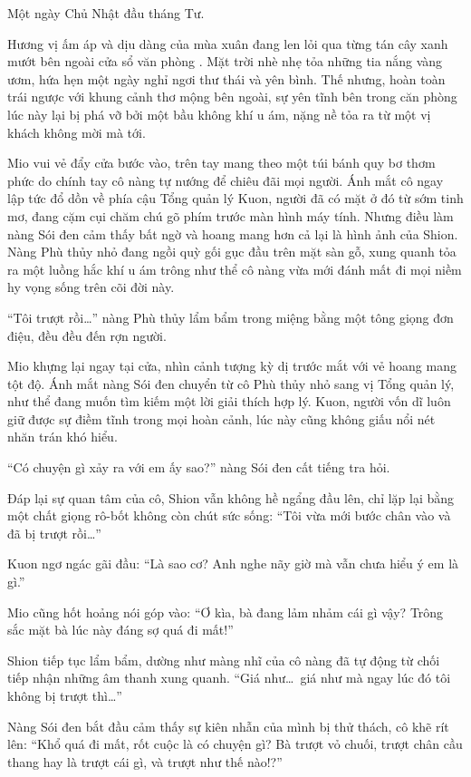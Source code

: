 \documentclass[../main.tex]{subfiles}
\begin{document}
Một ngày Chủ Nhật đầu tháng Tư.

Hương vị ấm áp và dịu dàng của mùa xuân đang len lỏi qua từng tán cây xanh mướt bên ngoài cửa sổ văn phòng \hll. Mặt trời nhè nhẹ tỏa những tia nắng vàng ươm, hứa hẹn một ngày nghỉ ngơi thư thái và yên bình. Thế nhưng, hoàn toàn trái ngược với khung cảnh thơ mộng bên ngoài, sự yên tĩnh bên trong căn phòng lúc này lại bị phá vỡ bởi một bầu không khí u ám, nặng nề tỏa ra từ một vị khách không mời mà tới.

Mio vui vẻ đẩy cửa bước vào, trên tay mang theo một túi bánh quy bơ thơm phức do chính tay cô nàng tự nướng để chiêu đãi mọi người. Ánh mắt cô ngay lập tức đổ dồn về phía cậu Tổng quản lý Kuon, người đã có mặt ở đó từ sớm tinh mơ, đang cặm cụi chăm chú gõ phím trước màn hình máy tính. Nhưng điều làm nàng Sói đen cảm thấy bất ngờ và hoang mang hơn cả lại là hình ảnh của Shion. Nàng Phù thủy nhỏ đang ngồi quỳ gối gục đầu trên mặt sàn gỗ, xung quanh tỏa ra một luồng hắc khí u ám trông như thể cô nàng vừa mới đánh mất đi mọi niềm hy vọng sống trên cõi đời này.


``Tôi trượt rồi\dots'' nàng Phù thủy lẩm bẩm trong miệng bằng một tông giọng đơn điệu, đều đều đến rợn người.

Mio khựng lại ngay tại cửa, nhìn cảnh tượng kỳ dị trước mắt với vẻ hoang mang tột độ. Ánh mắt nàng Sói đen chuyển từ cô Phù thủy nhỏ sang vị Tổng quản lý, như thể đang muốn tìm kiếm một lời giải thích hợp lý. Kuon, người vốn dĩ luôn giữ được sự điềm tĩnh trong mọi hoàn cảnh, lúc này cũng không giấu nổi nét nhăn trán khó hiểu.

``Có chuyện gì xảy ra với em ấy sao?'' nàng Sói đen cất tiếng tra hỏi.

Đáp lại sự quan tâm của cô, Shion vẫn không hề ngẩng đầu lên, chỉ lặp lại bằng một chất giọng rô-bốt không còn chút sức sống: ``Tôi vừa mới bước chân vào và đã bị trượt rồi\dots''

Kuon ngơ ngác gãi đầu: ``Là sao cơ? Anh nghe nãy giờ mà vẫn chưa hiểu ý em là gì.''

Mio cũng hốt hoảng nói góp vào: ``Ơ kìa, bà đang lảm nhảm cái gì vậy? Trông sắc mặt bà lúc này đáng sợ quá đi mất!''

Shion tiếp tục lẩm bẩm, dường như màng nhĩ của cô nàng đã tự động từ chối tiếp nhận những âm thanh xung quanh. ``Giá như\dots\ giá như mà ngay lúc đó tôi không bị trượt thì\dots''

Nàng Sói đen bắt đầu cảm thấy sự kiên nhẫn của mình bị thử thách, cô khẽ rít lên: ``Khổ quá đi mất, rốt cuộc là có chuyện gì? Bà trượt vỏ chuối, trượt chân cầu thang hay là trượt cái gì, và trượt như thế nào!?''
\end{document}
